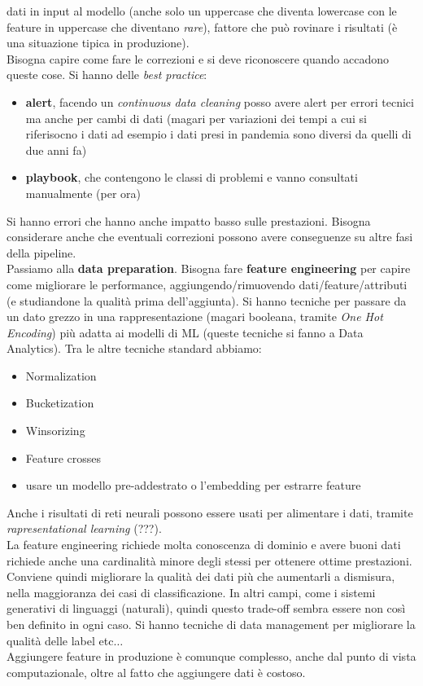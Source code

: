 \documentclass[a4paper,12pt, oneside]{book}
\begin{document}
dati in input al modello (anche solo un uppercase che diventa lowercase con le
feature in uppercase che diventano \textit{rare}),
fattore che può rovinare i risultati (è una situazione tipica in produzione).\\
Bisogna capire come fare le correzioni e si deve riconoscere quando accadono
queste cose. Si hanno delle \textit{best practice}:
\begin{itemize}
  \item \textbf{alert}, facendo un \textit{continuous data cleaning} posso avere
  alert per errori tecnici ma anche per cambi di dati (magari per variazioni dei
  tempi a cui si riferisocno i dati ad esempio i dati presi in pandemia sono
  diversi da quelli di due anni fa)
  \item \textbf{playbook}, che contengono le classi di problemi e vanno
  consultati manualmente (per ora)
\end{itemize}
Si hanno errori che hanno anche impatto basso sulle prestazioni. Bisogna
considerare anche che eventuali correzioni possono avere conseguenze su altre
fasi della pipeline.\\
Passiamo alla \textbf{data preparation}. Bisogna fare \textbf{feature
  engineering} per capire come migliorare le performance,
aggiungendo/rimuovendo dati/feature/attributi (e studiandone la qualità prima
dell'aggiunta). Si hanno tecniche per passare da un dato grezzo in una
rappresentazione (magari booleana, tramite \textit{One Hot Encoding}) più adatta
ai modelli di ML (queste tecniche si fanno a Data Analytics). Tra le altre
tecniche standard abbiamo:
\begin{itemize}
  \item Normalization
  \item Bucketization
  \item Winsorizing
  \item Feature crosses
  \item usare un modello pre-addestrato o l'embedding per estrarre feature 
\end{itemize}
Anche i risultati di reti neurali possono essere usati per alimentare i dati,
tramite \textit{rapresentational learning} (???).\\
La feature engineering richiede molta conoscenza di dominio e avere buoni dati
richiede anche una cardinalità minore degli stessi per ottenere ottime
prestazioni. Conviene quindi migliorare la qualità dei dati più che aumentarli a
dismisura, nella maggioranza dei casi di classificazione. In altri campi, come i
sistemi generativi di linguaggi (naturali), quindi questo trade-off sembra
essere non così ben definito in ogni caso. Si hanno tecniche di data management
per migliorare la qualità delle label etc$\ldots$\\
Aggiungere feature in produzione è comunque complesso, anche dal punto di vista
computazionale, oltre al fatto che aggiungere dati è costoso.
\end{document}
